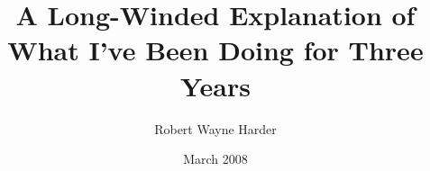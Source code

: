 \documentclass{report}
\title{A Long-Winded Explanation of What I've Been Doing for Three Years}
\author{Robert Wayne Harder}
\date{March 2008}
\begin{document}
  \begin{dissertation}
    \makecover
      \blankpage
    \makesfTwoNinetyEight       %
      \blankpage
    \maketitle                  %
    \tableofcontents            %
    \listoffigures              %
    \listoftables               %
    
    
    
    
    
    
  \end{dissertation}
\end{document}
